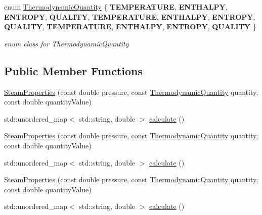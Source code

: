 \begin{DoxyCompactItemize}
\item 
\mbox{\label{class_steam_properties_ae0294bedf7d178c2d8fb6aed0f62fbff}} 
enum \hyperlink{class_steam_properties_ae0294bedf7d178c2d8fb6aed0f62fbff}{Thermodynamic\+Quantity} \{ \newline
{\bfseries T\+E\+M\+P\+E\+R\+A\+T\+U\+RE}, 
{\bfseries E\+N\+T\+H\+A\+L\+PY}, 
{\bfseries E\+N\+T\+R\+O\+PY}, 
{\bfseries Q\+U\+A\+L\+I\+TY}, 
\newline
{\bfseries T\+E\+M\+P\+E\+R\+A\+T\+U\+RE}, 
{\bfseries E\+N\+T\+H\+A\+L\+PY}, 
{\bfseries E\+N\+T\+R\+O\+PY}, 
{\bfseries Q\+U\+A\+L\+I\+TY}, 
\newline
{\bfseries T\+E\+M\+P\+E\+R\+A\+T\+U\+RE}, 
{\bfseries E\+N\+T\+H\+A\+L\+PY}, 
{\bfseries E\+N\+T\+R\+O\+PY}, 
{\bfseries Q\+U\+A\+L\+I\+TY}
 \}\begin{DoxyCompactList}\small\item\em enum class for Thermodynamic\+Quantity \end{DoxyCompactList}
\end{DoxyCompactItemize}
\subsection*{Public Member Functions}
\begin{DoxyCompactItemize}
\item 
\hyperlink{class_steam_properties_a976e08ed0433943d469a8c2f75d2ac68}{Steam\+Properties} (const double pressure, const \hyperlink{class_steam_properties_ae0294bedf7d178c2d8fb6aed0f62fbff}{Thermodynamic\+Quantity} quantity, const double quantity\+Value)
\item 
std\+::unordered\+\_\+map$<$ std\+::string, double $>$ \hyperlink{class_steam_properties_a449e2da87adb5a207bc73ec90f87922a}{calculate} ()
\item 
\hyperlink{class_steam_properties_a976e08ed0433943d469a8c2f75d2ac68}{Steam\+Properties} (const double pressure, const \hyperlink{class_steam_properties_ae0294bedf7d178c2d8fb6aed0f62fbff}{Thermodynamic\+Quantity} quantity, const double quantity\+Value)
\item 
std\+::unordered\+\_\+map$<$ std\+::string, double $>$ \hyperlink{class_steam_properties_a25dc635f2d8f24e0aa483ab86e5f10f0}{calculate} ()
\item 
\hyperlink{class_steam_properties_a976e08ed0433943d469a8c2f75d2ac68}{Steam\+Properties} (const double pressure, const \hyperlink{class_steam_properties_ae0294bedf7d178c2d8fb6aed0f62fbff}{Thermodynamic\+Quantity} quantity, const double quantity\+Value)
\item 
std\+::unordered\+\_\+map$<$ std\+::string, double $>$ \hyperlink{class_steam_properties_a25dc635f2d8f24e0aa483ab86e5f10f0}{calculate} ()
\end{DoxyCompactItemize}


